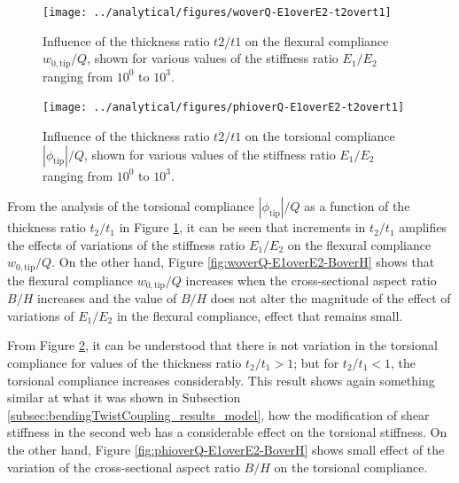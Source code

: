     \begin{figure}[!htpb] %
      \centering
      \texttt{[image: ../analytical/figures/woverQ-E1overE2-t2overt1]}
      \caption[Influence of the thickness ratio $t2/t1$ on the flexural compliance]{Influence of the thickness ratio $t2/t1$ on the flexural compliance $w_{\mathrm{0,tip}} / Q$, shown for various values of the stiffness ratio $E_1/E_2$ ranging from $10^0$ to $10^3$. }\label{fig:woverQ-E1overE2-t2overt1}
    \end{figure}

    \begin{figure}[!htpb] %
      \centering
      \texttt{[image: ../analytical/figures/phioverQ-E1overE2-t2overt1]}
      \caption[Influence of the thickness ratio $t2/t1$ on the torsional compliance]{Influence of the thickness ratio $t2/t1$ on the torsional compliance $|\phi_{\mathrm{tip}}| / Q$, shown for various values of the stiffness ratio $E_1/E_2$ ranging from $10^0$ to $10^3$. }\label{fig:phioverQ-E1overE2-t2overt1}
    \end{figure}

    \clearpage
    From the analysis of the torsional compliance $|\phi_{\mathrm{tip}}| / Q$ as a function of the thickness ratio $t_2/t_1$ in Figure \ref{fig:woverQ-E1overE2-t2overt1}, it can be seen that increments in $t_2/t_1$ amplifies the effects of variations of the stiffness ratio $E_1/E_2$ on the flexural compliance $w_{\mathrm{0,tip}} / Q$. On the other hand, Figure \ref{fig:woverQ-E1overE2-BoverH} shows that the flexural compliance $w_{\mathrm{0,tip}} / Q$ increases when the cross-sectional aspect ratio $B/H$ increases and the value of $B/H$ does not alter the magnitude of the effect of variations of $E_1/E_2$ in the flexural compliance, effect that remains small.

    From Figure \ref{fig:phioverQ-E1overE2-t2overt1}, it can be understood that there is not variation in the torsional compliance for values of the thickness ratio $t_2/t_1 > 1$; but for $t_2/t_1 < 1$, the torsional compliance increases considerably. This result shows again something similar at what it was shown in Subsection \ref{subsec:bendingTwistCoupling_results_model}, how the modification of shear stiffness in the second web has a considerable effect on the torsional stiffness. On the other hand, Figure \ref{fig:phioverQ-E1overE2-BoverH} shows small effect of the variation of the cross-sectional aspect ratio $B/H$ on the torsional compliance.


